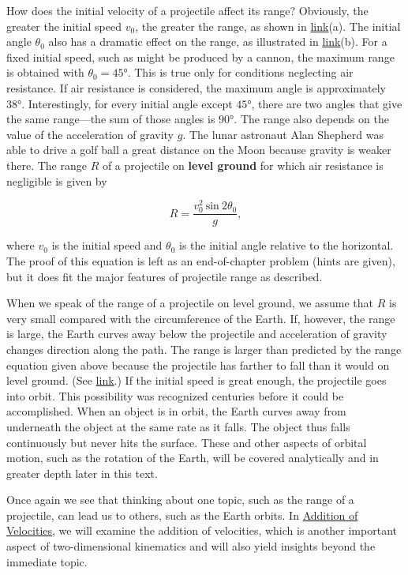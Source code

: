 \documentclass[
]{book}
\begin{document}
How does the initial velocity of a projectile affect its range?
Obviously, the greater the initial speed \(v_{0}{}\), the greater the
range, as shown in
\protect\hyperlink{import-auto-id1904800}{link}(a). The initial
angle \(\theta_{0}{}\) also has a dramatic effect on the range, as
illustrated in
\protect\hyperlink{import-auto-id1904800}{link}(b). For a fixed
initial speed, such as might be produced by a cannon, the maximum range
is obtained with \({\theta_{0} = \text{45°}}{}\). This is true only for
conditions neglecting air resistance. If air resistance is considered,
the maximum angle is approximately \(\text{38°}{}\). Interestingly, for
every initial angle except \(\text{45°}{}\), there are two angles that
give the same range---the sum of those angles is \(\text{90°}{}\). The
range also depends on the value of the acceleration of gravity \(g{}\).
The lunar astronaut Alan Shepherd was able to drive a golf ball a great
distance on the Moon because gravity is weaker there. The range \(R{}\) of
a projectile on \textbf{level ground} for which air resistance is negligible
is given by

\leavevmode\hypertarget{eip-240}{}%
\[{R = \frac{v_{0}^{2}\ \text{sin}\ {2\theta}_{0}}{g}}\text{,}{}\]

where \(v_{0}{}\) is the initial speed and \(\theta_{0}{}\) is the initial
angle relative to the horizontal. The proof of this equation is left as
an end-of-chapter problem (hints are given), but it does fit the major
features of projectile range as described.

When we speak of the range of a projectile on level ground, we assume
that \(R{}\) is very small compared with the circumference of the Earth.
If, however, the range is large, the Earth curves away below the
projectile and acceleration of gravity changes direction along the path.
The range is larger than predicted by the range equation given above
because the projectile has farther to fall than it would on level
ground. (See \protect\hyperlink{import-auto-id1645881}{link}.) If
the initial speed is great enough, the projectile goes into orbit. This
possibility was recognized centuries before it could be accomplished.
When an object is in orbit, the Earth curves away from underneath the
object at the same rate as it falls. The object thus falls continuously
but never hits the surface. These and other aspects of orbital motion,
such as the rotation of the Earth, will be covered analytically and in
greater depth later in this text.

Once again we see that thinking about one topic, such as the range of a
projectile, can lead us to others, such as the Earth orbits. In
\href{/m55089}{Addition of Velocities}, we will examine the addition of
velocities, which is another important aspect of two-dimensional
kinematics and will also yield insights beyond the immediate topic.
\end{document}
